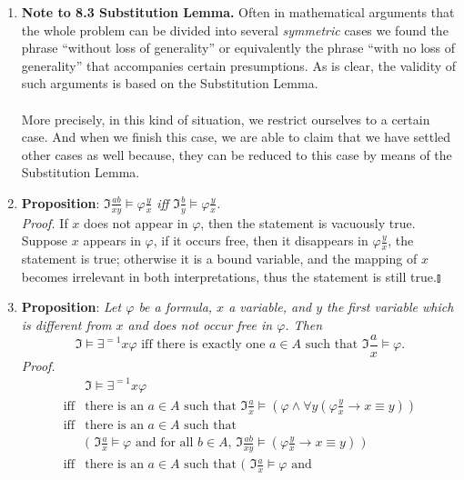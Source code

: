 \begin{enumerate}[1.]
\item \textbf{Note to 8.3 Substitution Lemma.} Often in mathematical arguments that the whole problem can be divided into several \emph{symmetric} cases we found the phrase ``without loss of generality'' or equivalently the phrase ``with no loss of generality'' that accompanies certain presumptions. As is clear, the validity of such arguments is based on the Substitution Lemma.\\
\\
More precisely, in this kind of situation, we restrict ourselves to a certain case. And when we finish this case, we are able to claim that we have settled other cases as well because, they can be reduced to this case by means of the Substitution Lemma.
%
\item \textbf{Proposition}: \textit{$\mathfrak{I} \frac{ab}{xy} \models \varphi \frac{y}{x}$ iff $\mathfrak{I} \frac{b}{y} \models \varphi \frac{y}{x}$.}\\
\textit{Proof.} If $x$ does not appear in $\varphi$, then the statement is vacuously true. Suppose $x$ appears in $\varphi$, if it occurs free, then it disappears in $\varphi \frac{y}{x}$, the statement is true; otherwise it is a bound variable, and the mapping of $x$ becomes irrelevant in both interpretations, thus the statement is still true.\nolinebreak\hfill$\talloblong$
%
\item \textbf{Proposition}: \textit{Let $\varphi$ be a formula, $x$ a variable, and $y$ the first variable which is different from $x$ and does not occur free in $\varphi$. Then
\[
\mathfrak{I} \models \exists^{=1} x \varphi \mbox{ iff there is exactly one $a \in A$ such that $\mathfrak{I} \frac{a}{x} \models \varphi$}.
\]
}
\textit{Proof.}
\[
\begin{array}{ll}
\, & \mathfrak{I} \models \exists^{=1} x \varphi \\
\mbox{iff} & \mbox{there is an $a \in A$ such that $\mathfrak{I} \frac{a}{x} \models ( \varphi \land \forall y ( \varphi \frac{y}{x} \rightarrow x \equiv y ) )$} \\
\mbox{iff} & \mbox{there is an $a \in A$ such that} \\
\, & \mbox{( $\mathfrak{I} \frac{a}{x} \models \varphi$ and for all $b \in A$, $\mathfrak{I} \frac{ab}{xy} \models ( \varphi \frac{y}{x} \rightarrow x \equiv y )$ )} \\
\mbox{iff} & \mbox{there is an $a \in A$ such that ( $\mathfrak{I} \frac{a}{x} \models \varphi$ and} \\

\end{array}\]
\end{enumerate}
